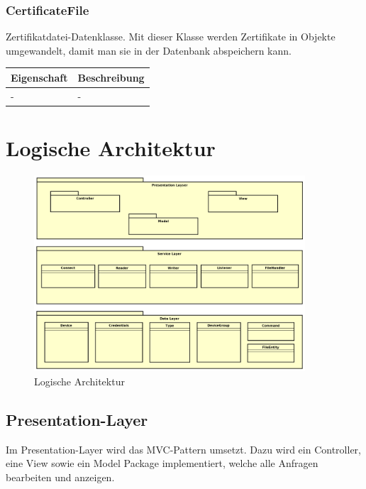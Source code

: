 \subsubsection{CertificateFile}
Zertifikatdatei-Datenklasse. Mit dieser Klasse werden Zertifikate in Objekte umgewandelt, damit man sie in der Datenbank abspeichern kann.
\begin{table}[H]
\centering
    \begin{tabular}{@{}l p{14.1cm} @{}}\toprule    
    {Eigenschaft} & {Beschreibung}\\ \midrule      
    - & -\\
    \bottomrule
    \end{tabular}
\end{table}


\section{Logische Architektur}
\begin{figure} [H]
	\begin{center}
	\includegraphics[width=0.90\textwidth]{images/architektur.png}
	\caption{Logische Architektur}
	\end{center}
\end{figure}


\subsection{Presentation-Layer}
Im Presentation-Layer wird das MVC-Pattern umsetzt. Dazu wird ein Controller, eine View sowie ein Model Package implementiert, welche alle Anfragen bearbeiten und anzeigen.
